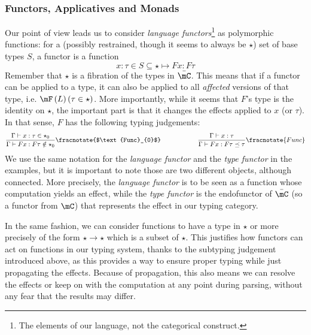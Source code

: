 \documentclass[math, english, info]{cours}
\begin{document}
\subsubsection{Functors, Applicatives and Monads}\label{subsubsec:functors}
Our point of view leads us to consider \emph{language functors}\footnote{The elements of our language, not the categorical construct.} as polymorphic functions: for a (possibly restrained, though it seems to always be $\star$) set of base types $S$, a functor is a function
\begin{equation*}
	x: \tau\in S\subseteq \star \mapsto F x: F\tau
\end{equation*}
Remember that $\star$ is a fibration of the types in $\bar{\mC}$.
This means that if a functor can be applied to a type, it can also be applied to all \emph{affected} versions of that type, i.e. $\mF\left( L \right)(\tau\in \star)$.
More importantly, while it seems that $F$'s type is the identity on $\star$, the important part is that it changes the effects applied to $x$ (or $\tau$).
In that sense, $F$ has the following typing judgements:
\begin{equation*}
	\frac{\Gamma\vdash x: \tau \in \star_{0}}{\Gamma\vdash F x: F\tau \notin \star_{0}}\fracnotate{$\text{Func}_{0}$} \hspace{2cm} \frac{\Gamma\vdash x: \tau}{\Gamma\vdash Fx : F\tau\preceq \tau}\fracnotate{Func}
\end{equation*}
We use the same notation for the \emph{language functor} and the \emph{type functor} in the examples, but it is important to note those are two different objects, although connected.
More precisely, the \emph{language functor} is to be seen as a function whose computation yields an effect, while the \emph{type functor} is the endofunctor of $\bar{\mC}$ (so a functor from $\mC$) that represents the effect in our typing category.

In the same fashion, we can consider functions to have a type in $\star$ or more precisely of the form $\star \to \star$ which is a subset of $\star$.
This justifies how functors can act on functions in our typing system, thanks to the subtyping judgement introduced above, as this provides a way to ensure proper typing while just propagating the effects.
Because of propagation, this also means we can resolve the effects or keep on with the computation at any point during parsing, without any fear that the results may differ.

\medskip
\end{document}
